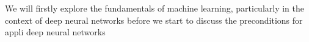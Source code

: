 We will firstly explore the fundamentals of machine learning, particularly in the context of deep neural networks before we start to discuss the preconditions for appli deep neural networks